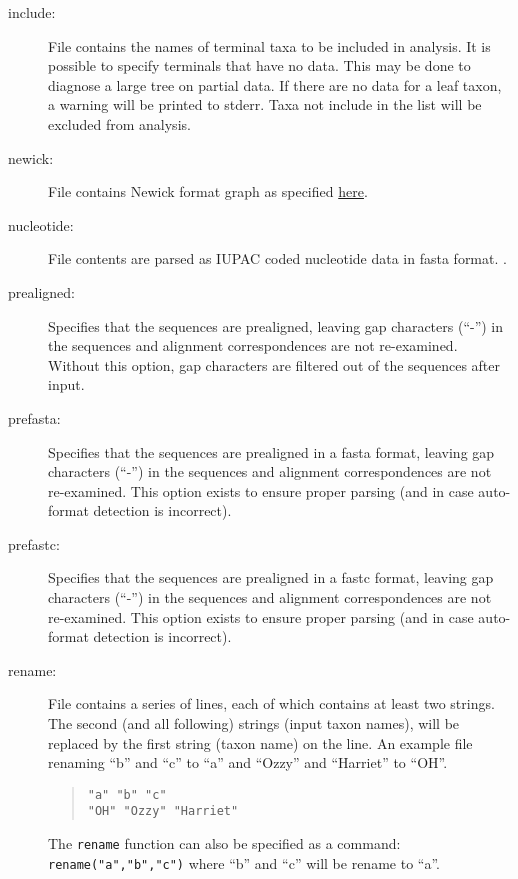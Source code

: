 \begin{description}
		\item [include:] File contains the names of terminal taxa to be included in analysis. It is possible to 
		specify terminals that have no data. This may be done to diagnose a large tree on partial data. If 
		there are no data for a leaf taxon, a warning will be printed to stderr. Taxa not include in the list will 
		be excluded from analysis. 
			
		\item [newick:] File contains Newick format graph as specified 
		\href{https://evolution.genetics.washington.edu/phylip/newick_doc.html}{here}.
			
		\item [nucleotide:] File contents are parsed as IUPAC coded nucleotide data in fasta 
			\citep{PearsonandLipman1988} format. .
			
		\item [prealigned:] Specifies that the sequences are prealigned, leaving gap characters
			(``-'') in the sequences and alignment correspondences are not re-examined. Without this option,
			gap characters are filtered out of the sequences after input.
			
		\item [prefasta:] Specifies that the sequences are prealigned in a fasta format, leaving gap characters
			(``-'') in the sequences and alignment correspondences are not re-examined. This option exists to 
			ensure proper parsing (and in case auto-format detection is incorrect).
			
		\item [prefastc:] Specifies that the sequences are prealigned in a fastc format, leaving gap characters
			(``-'') in the sequences and alignment correspondences are not re-examined. This option exists 
			to ensure proper parsing (and in case auto-format detection is incorrect).
			
		\item [rename:] File contains a series of lines, each of which contains at least two strings. The second 
		(and all following) strings (input taxon names),
			will be replaced by the first string (taxon name) on the line. An example file renaming ``b'' and ``c'' 
			to ``a'' and ``Ozzy'' and ``Harriet'' to ``OH''.
				\begin{quote}
					\texttt{"a" "b" "c"}\\
					\texttt{"OH" "Ozzy" "Harriet"}
				\end{quote}
		
		The \texttt{rename} function can also be specified as a command: \texttt{rename("a","b","c")} where 
		``b'' and ``c'' will be rename to ``a''. 
			 

\end{description}
